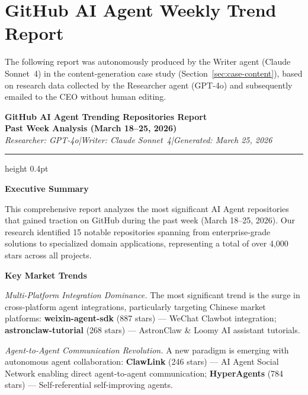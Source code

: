 \section{GitHub AI Agent Weekly Trend Report}
\label{appendix:github-report}

The following report was autonomously produced by the Writer agent (Claude Sonnet~4)
in the content-generation case study (Section~\ref{sec:case-content}), based on
research data collected by the Researcher agent (GPT-4o) and subsequently emailed
to the CEO without human editing.

\begin{mdframed}[
  linewidth=0.8pt,
  linecolor=black!40,
  backgroundcolor=black!2,
  innertopmargin=16pt,
  innerbottommargin=16pt,
  innerleftmargin=18pt,
  innerrightmargin=18pt,
  roundcorner=4pt
]
\sloppy
{\centering
  {\large\bfseries GitHub AI Agent Trending Repositories Report}\\[4pt]
  {\normalsize\bfseries Past Week Analysis (March 18--25, 2026)}\\[2pt]
  \textit{\small Researcher: GPT-4o\quad|\quad Writer: Claude Sonnet~4\quad|\quad Generated: March 25, 2026}
\par}

\vspace{8pt}
\hrule height 0.4pt
\vspace{10pt}

\noindent\textbf{Executive Summary}

\noindent
This comprehensive report analyzes the most significant AI Agent repositories that gained traction on GitHub during the past week (March 18--25, 2026). Our research identified 15 notable repositories spanning from enterprise-grade solutions to specialized domain applications, representing a total of over 4,000 stars across all projects.

\vspace{8pt}
\noindent\textbf{Key Market Trends}

\noindent\textit{Multi-Platform Integration Dominance.}\quad
The most significant trend is the surge in cross-platform agent integrations, particularly targeting Chinese market platforms: \textbf{weixin-agent-sdk} (887 stars) --- WeChat Clawbot integration; \textbf{astronclaw-tutorial} (268 stars) --- AstronClaw \& Loomy AI assistant tutorials.

\vspace{4pt}
\noindent\textit{Agent-to-Agent Communication Revolution.}\quad
A new paradigm is emerging with autonomous agent collaboration: \textbf{ClawLink} (246 stars) --- AI Agent Social Network enabling direct agent-to-agent communication; \textbf{HyperAgents} (784 stars) --- Self-referential self-improving agents.


\end{mdframed}
